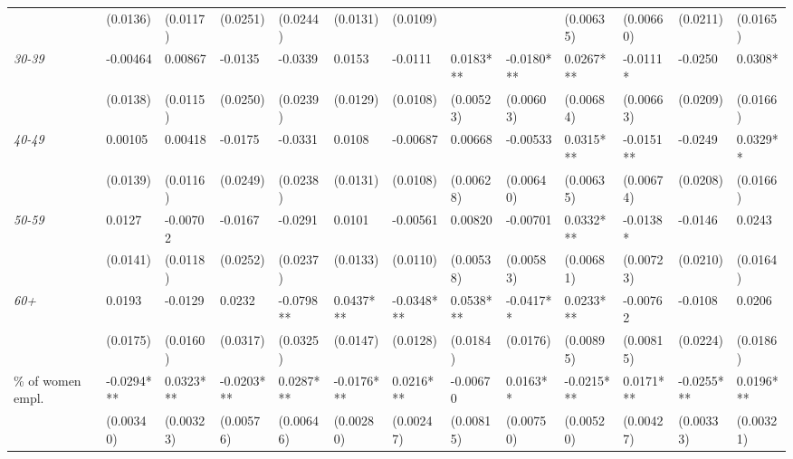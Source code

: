 \documentclass[Review,times,sageh,11pt]{sagej}
\begin{document}
\begin{sidewaystable}[htb]
{\begin{threeparttable}
\begin{tabular}{l*{12}{l}}
                                &       (0.0136)    & (0.0117)    & (0.0251)     & (0.0244)   & (0.0131)   & (0.0109)    &             &            & (0.00635)  & (0.00660)  & (0.0211)     & (0.0165)   \\[1ex]
\quad \textit{30-39}            &       -0.00464    & 0.00867     & -0.0135      & -0.0339    & 0.0153     & -0.0111     & 0.0183***   & -0.0180*** & 0.0267***  & -0.0111*   & -0.0250      & 0.0308*    \\
                                &       (0.0138)    & (0.0115)    & (0.0250)     & (0.0239)   & (0.0129)   & (0.0108)    & (0.00523)   & (0.00603)  & (0.00684)  & (0.00663)  & (0.0209)     & (0.0166)   \\[1ex]
\quad \textit{40-49}            &       0.00105     & 0.00418     & -0.0175      & -0.0331    & 0.0108     & -0.00687    & 0.00668     & -0.00533   & 0.0315***  & -0.0151**  & -0.0249      & 0.0329**   \\
                                &       (0.0139)    & (0.0116)    & (0.0249)     & (0.0238)   & (0.0131)   & (0.0108)    & (0.00628)   & (0.00640)  & (0.00635)  & (0.00674)  & (0.0208)     & (0.0166)   \\[1ex]
\quad \textit{50-59}            &       0.0127      & -0.00702    & -0.0167      & -0.0291    & 0.0101     & -0.00561    & 0.00820     & -0.00701   & 0.0332***  & -0.0138*   & -0.0146      & 0.0243     \\
                                &       (0.0141)    & (0.0118)    & (0.0252)     & (0.0237)   & (0.0133)   & (0.0110)    & (0.00538)   & (0.00583)  & (0.00681)  & (0.00723)  & (0.0210)     & (0.0164)   \\[1ex]
\quad \textit{60+}              &       0.0193      & -0.0129     & 0.0232       & -0.0798**  & 0.0437***  & -0.0348***  & 0.0538***   & -0.0417**  & 0.0233***  & -0.00762   & -0.0108      & 0.0206     \\
                                &       (0.0175)    & (0.0160)    & (0.0317)     & (0.0325)   & (0.0147)   & (0.0128)    & (0.0184)    & (0.0176)   & (0.00895)  & (0.00815)  & (0.0224)     & (0.0186)   \\[1ex]
\% of women empl.               &       -0.0294***  & 0.0323***   & -0.0203***   & 0.0287***  & -0.0176*** & 0.0216***   & -0.00670    & 0.0163**   & -0.0215*** & 0.0171***  & -0.0255***   & 0.0196***  \\
                                &       (0.00340)   & (0.00323)   & (0.00576)    & (0.00646)  & (0.00280)  & (0.00247)   & (0.00815)   & (0.00750)  & (0.00520)  & (0.00427)  & (0.00333)    & (0.00321)  \\[1ex]

\end{tabular}
\end{threeparttable}}
\end{sidewaystable}
\end{document}

